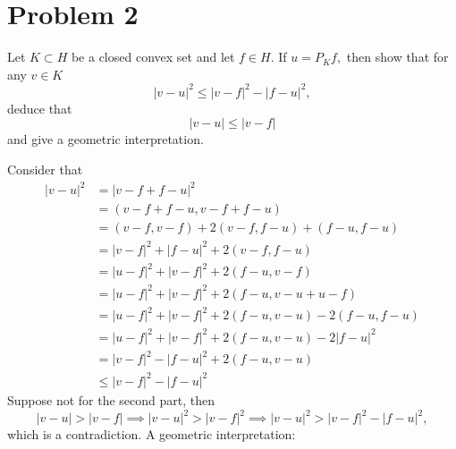 \documentclass[11pt]{article}
\begin{document}
\section*{Problem 2}
\begin{problem}
    Let $K\subset H$ be a closed convex set and let $f\in H.$ If $u = P_Kf,$ then show that for any $v\in K$
    \[|v-u|^2 \leq |v-f|^2 - |f-u|^2,\] deduce that 
    \[|v-u|\leq |v-f|\] and give a geometric interpretation.
\end{problem}
\begin{solution}
    Consider that 
    \begin{align*}
        |v - u|^2 &= |v-f + f-u|^2\\
        &= (v-f + f-u ,v-f + f-u)\\
        &= (v-f, v-f) + 2(v-f, f-u) + (f-u, f-u)\\
        &= |v-f|^2 + |f-u|^2 + 2(v - f, f-u)\\
        &= |u-f|^2 + |v-f|^2 + 2(f-u, v-f)\\
        &= |u-f|^2 + |v-f|^2 + 2(f-u, v-u + u -f)\\
        &= |u-f|^2 + |v-f|^2 + 2(f - u, v-u) -2 (f-u, f-u)\\
        &= |u-f|^2 + |v-f|^2 + 2(f - u, v-u) -2 |f-u|^2\\
        &= |v-f|^2 - |f-u|^2 + 2(f-u, v-u)\\
        &\leq |v-f|^2 - |f-u|^2
    \end{align*}
    Suppose not for the second part, then 
    \[|v-u| > |v-f| \implies |v-u|^2 > |v-f|^2 \implies |v-u|^2 > |v-f|^2 - |f-u|^2,\] which is a contradiction.
    A geometric interpretation:
    
\end{solution}

\newpage
\end{document}
